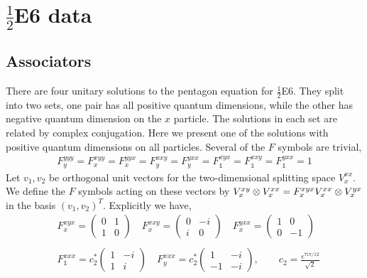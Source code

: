 
\section{$\frac{1}{2}$E6 data}

\subsection{Associators}
\label{E6Fsymbols}
There are four unitary solutions to the pentagon equation for $\frac{1}{2}$E6. They split into two sets, one pair has all positive quantum dimensions, while the other has negative quantum dimension on the $x$ particle. 
The solutions in each set are related by complex conjugation. 
Here we present one of the solutions with positive quantum dimensions on all particles. 
Several of the $F$ symbols are trivial,
\begin{align}
F^{yyy}_y = F^{xyy}_x = F^{yyx}_x = F^{xxy}_y  = F^{yxx}_y = F^{xyx}_{\mathds{1}} = F^{xxy}_{\mathds{1}} = F^{yxx}_{\mathds{1}}= 1
\end{align}
Let $v_1, v_2$ be orthogonal unit vectors for the two-dimensional splitting space $V^{xx}_x$. 
We define the $F$ symbols acting on these vectors by $V^{xy}_x \otimes V^{xx}_x  = F^{xyx}_x V^{xx}_x \otimes V^{yx}_x$ in the basis $(v_1, v_2)^{T}$.
Explicitly we have,
\begin{align}
&F^{xyx}_x = \left(\begin{matrix}
0&1\\
1&0
\end{matrix} \right) \quad
F^{xxy}_x = \left(\begin{matrix}
0&-i\\
i&0
\end{matrix} \right) \quad
F^{yxx}_x = \left(\begin{matrix}
1&0\\
0&-1
\end{matrix} \right) 
\\
\\
&F^{xxx}_{\mathds{1}} = c_2^* \left(\begin{matrix}
1&-i\\
1&i
\end{matrix} \right) \quad
F^{xxx}_y = c_2^*\left(\begin{matrix}
1&-i\\
-1&-i
\end{matrix} \right), \quad \quad c_2  = \frac{e^{7 i \pi/12}}{\sqrt{2}}
\end{align}

